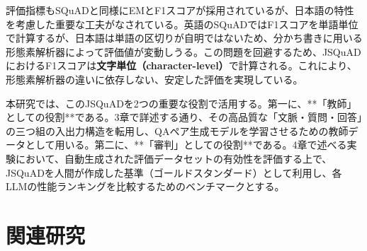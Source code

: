 \documentclass[a4paper,11pt]{jreport}
\begin{document}
評価指標もSQuADと同様にEMとF1スコアが採用されているが、日本語の特性を考慮した重要な工夫がなされている。英語のSQuADではF1スコアを単語単位で計算するが、日本語は単語の区切りが自明ではないため、分かち書きに用いる形態素解析器によって評価値が変動しうる。この問題を回避するため、JSQuADにおけるF1スコアは\textbf{文字単位（character-level）}で計算される\cite{JGLUE}。これにより、形態素解析器の違いに依存しない、安定した評価を実現している。

本研究では、このJSQuADを2つの重要な役割で活用する。第一に、**「教師」としての役割**である。3章で詳述する通り、その高品質な「文脈・質問・回答」の三つ組の入出力構造を転用し、QAペア生成モデルを学習させるための教師データとして用いる。第二に、**「審判」としての役割**である。4章で述べる実験において、自動生成された評価データセットの有効性を評価する上で、JSQuADを人間が作成した基準（ゴールドスタンダード）として利用し、各LLMの性能ランキングを比較するためのベンチマークとする。




\chapter{関連研究}



\end{document}
